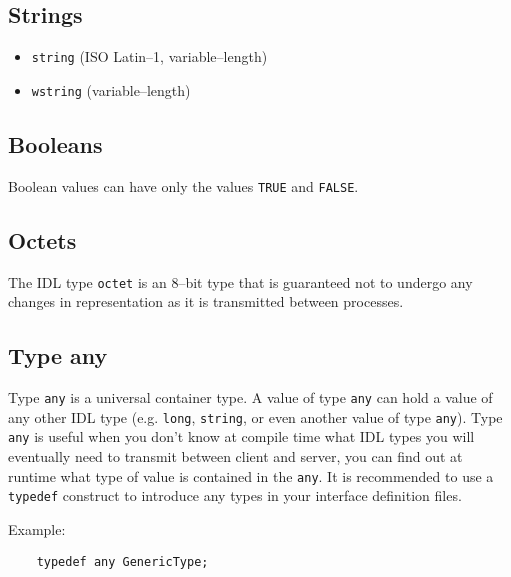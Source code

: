 \subsection{Strings}
\begin{itemize}
  \item {\tt string} (ISO Latin--1, variable--length)
  \item {\tt wstring} (variable--length)
\end{itemize}

\subsection{Booleans}
Boolean values can have only the values {\tt TRUE} and {\tt FALSE}. 

\subsection{Octets}
The IDL type {\tt octet} is an 8--bit type that is guaranteed not to undergo any
changes in representation as it is transmitted between processes.

\subsection{Type any}
Type {\tt any} is a universal container type. A value of type {\tt any} can hold
a value of any other IDL type (e.g. {\tt long}, {\tt string}, or even another
value of type {\tt any}).
Type {\tt any} is useful when you don't know at compile time what IDL types you
will eventually need to transmit between client and server, you can find out at
runtime what type of value is contained in the {\tt any}.
It is recommended to use a {\tt typedef} construct to introduce any types in your
interface definition files. 

\vspace{2mm}
Example:
\begin{verbatim}
    typedef any GenericType;
\end{verbatim}
  
